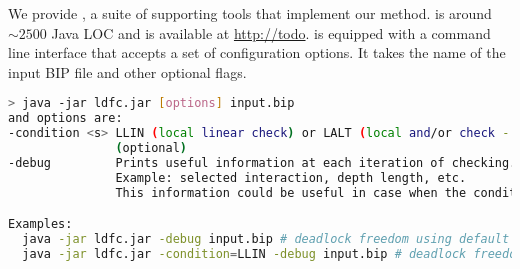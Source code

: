 %
We provide \deadlocktool{}, a suite of supporting tools that implement our method. \deadlocktool{} is around $\sim 2500$ Java LOC and is available at 
\href{http://todo}{http://todo}. 
%
\deadlocktool{} is equipped with a command line interface that accepts a set 
of configuration options. 
It takes the name of the input BIP file and other optional flags. 
\begin{lstlisting}[language=Bash]
> java -jar ldfc.jar [options] input.bip 
and options are:
-condition <s> LLIN (local linear check) or LALT (local and/or check - default)
               (optional)
-debug         Prints useful information at each iteration of checking. 
               Example: selected interaction, depth length, etc.
               This information could be useful in case when the condition fails.

Examples:
  java -jar ldfc.jar -debug input.bip # deadlock freedom using default LALT
  java -jar ldfc.jar -condition=LLIN -debug input.bip # deadlock freedom using LLIN
\end{lstlisting}

